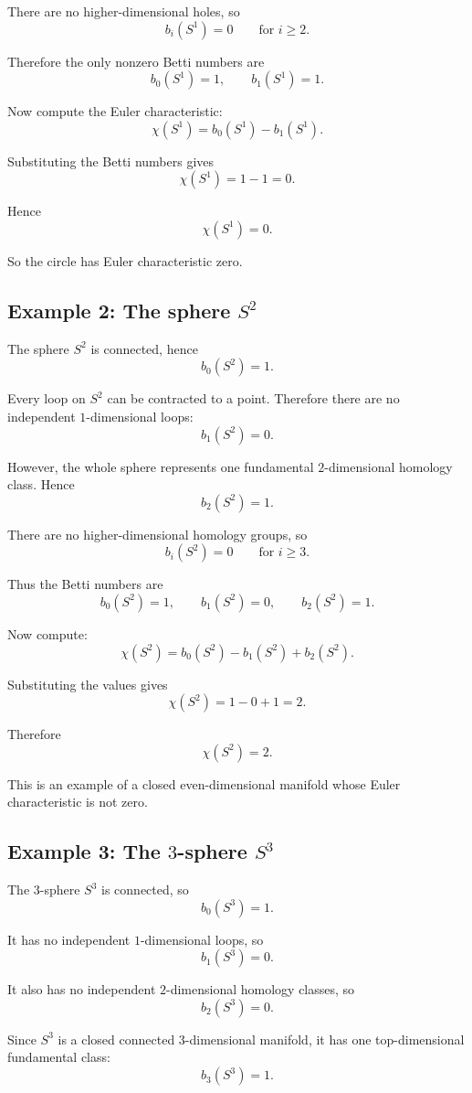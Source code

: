 \documentclass[12pt,a4paper]{article}
\theoremstyle{notespace}
\begin{document}
There are no higher-dimensional holes, so
\[
b_i(S^1)=0
\qquad
\text{for } i\geq 2.
\]

Therefore the only nonzero Betti numbers are
\[
b_0(S^1)=1,
\qquad
b_1(S^1)=1.
\]

Now compute the Euler characteristic:
\[
\chi(S^1)
=
b_0(S^1)-b_1(S^1).
\]

Substituting the Betti numbers gives
\[
\chi(S^1)=1-1=0.
\]

Hence
\[
\boxed{\chi(S^1)=0.}
\]

So the circle has Euler characteristic zero.

\subsection{Example 2: The sphere $S^2$}

The sphere $S^2$ is connected, hence
\[
b_0(S^2)=1.
\]

Every loop on $S^2$ can be contracted to a point. Therefore there are no
independent $1$-dimensional loops:
\[
b_1(S^2)=0.
\]

However, the whole sphere represents one fundamental $2$-dimensional homology
class. Hence
\[
b_2(S^2)=1.
\]

There are no higher-dimensional homology groups, so
\[
b_i(S^2)=0
\qquad
\text{for } i\geq 3.
\]

Thus the Betti numbers are
\[
b_0(S^2)=1,
\qquad
b_1(S^2)=0,
\qquad
b_2(S^2)=1.
\]

Now compute:
\[
\chi(S^2)
=
b_0(S^2)-b_1(S^2)+b_2(S^2).
\]

Substituting the values gives
\[
\chi(S^2)=1-0+1=2.
\]

Therefore
\[
\boxed{\chi(S^2)=2.}
\]

This is an example of a closed even-dimensional manifold whose Euler
characteristic is not zero.

\subsection{Example 3: The $3$-sphere $S^3$}

The $3$-sphere $S^3$ is connected, so
\[
b_0(S^3)=1.
\]

It has no independent $1$-dimensional loops, so
\[
b_1(S^3)=0.
\]

It also has no independent $2$-dimensional homology classes, so
\[
b_2(S^3)=0.
\]

Since $S^3$ is a closed connected $3$-dimensional manifold, it has one
top-dimensional fundamental class:
\[
b_3(S^3)=1.
\]
\end{document}
